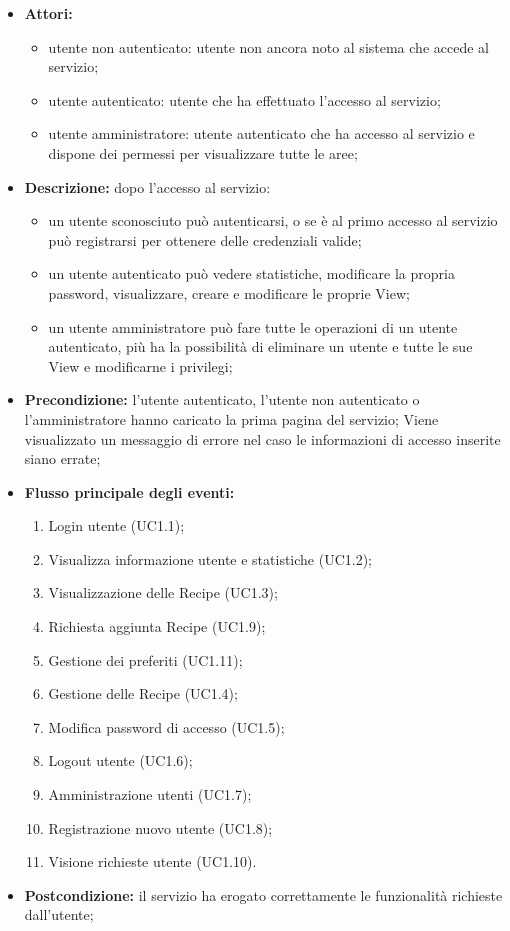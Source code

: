 \begin{itemize}
	\item \textbf{Attori:}
	\begin{itemize}
		\item utente non autenticato: utente non ancora noto al sistema che accede al servizio;
		\item utente autenticato: utente che ha effettuato l'accesso al servizio;
		\item utente amministratore: utente autenticato che ha accesso al servizio e dispone dei permessi per visualizzare tutte le aree;
	\end{itemize}
	\item \textbf{Descrizione:} dopo l'accesso al servizio:
	\begin{itemize}
		\item un utente sconosciuto può autenticarsi, o se è al primo accesso al servizio può registrarsi per ottenere delle credenziali valide;
		\item un utente autenticato può vedere statistiche, modificare la propria password, visualizzare, creare e modificare le proprie View;
		\item un utente amministratore può fare tutte le operazioni di un utente autenticato, più ha la possibilità di eliminare un utente e tutte le sue View e modificarne i privilegi;
	\end{itemize}
	\item \textbf{Precondizione:} l'utente autenticato, l'utente non autenticato o l'amministratore hanno caricato la prima pagina del servizio;
	Viene visualizzato un messaggio di errore nel caso le informazioni di accesso inserite siano errate;
	\item \textbf{Flusso principale degli eventi:}
	\begin{enumerate}
		\item Login utente (UC1.1);
		\item Visualizza informazione utente e statistiche (UC1.2);
		\item Visualizzazione delle Recipe (UC1.3);
		\item Richiesta aggiunta Recipe (UC1.9);
		\item Gestione dei preferiti (UC1.11);
		\item Gestione delle Recipe (UC1.4);
		\item Modifica password di accesso (UC1.5);
		\item Logout utente (UC1.6);
		\item Amministrazione utenti (UC1.7);
		\item Registrazione nuovo utente (UC1.8);
		\item Visione richieste utente (UC1.10).
	\end{enumerate}
	\item \textbf{Postcondizione:} il servizio ha erogato correttamente le funzionalità richieste dall'utente;
\end{itemize}

